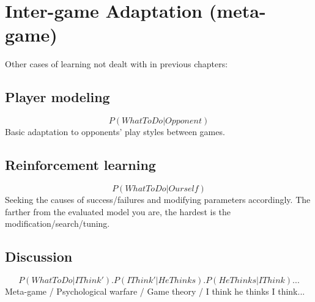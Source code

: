 \chapter{Inter-game Adaptation (meta-game)}
Other cases of learning not dealt with in previous chapters:

\section{Player modeling}
$$P(WhatToDo|Opponent)$$
Basic adaptation to opponents' play styles between games.

\section{Reinforcement learning}
$$P(WhatToDo|Ourself)$$
Seeking the causes of success/failures and modifying parameters accordingly. The farther from the evaluated model you are, the hardest is the modification/search/tuning.

\section{Discussion}
$$P(WhatToDo|IThink').P(IThink'|HeThinks).P(HeThinks|IThink)...$$
Meta-game / Psychological warfare / Game theory / I think he thinks I think...


